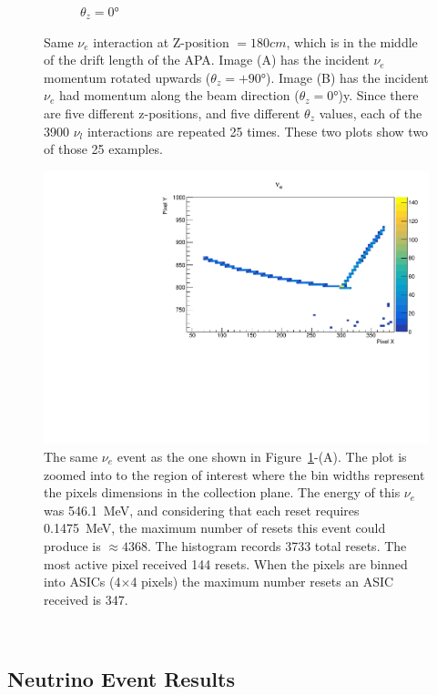 \begin{figure}
\begin{subfigure}{.5\textwidth}
  \caption{$\theta_{z} = 0$\unit{\degree}}
\end{subfigure}
\caption{Same $\nu_{e}$ interaction at Z-position $= 180 cm$, which is in the middle of the drift length of the APA.
Image (A) has the incident $\nu_{e}$ momentum rotated upwards ($\theta_{z} = +90$\unit{\degree}).
Image (B) has the incident $\nu_{e}$ had momentum along the beam direction ($\theta_{z} = 0$\unit{\degree})y.
Since there are five different z-positions, and five different $\theta_{z}$ values, each of the 3900 $\nu_{l}$ interactions are repeated 25 times.
These two plots show two of those 25 examples.
}
\label{fig:compare_integral}
\end{figure}

\begin{figure}[]
\centering
\includegraphics[width=\textwidth]{images/electron_fhc_23708_event.pdf}
\caption{The same $\nu_{e}$ event as the one shown in Figure~\ref{fig:compare_integral}-(A).
The plot is zoomed into to the region of interest where the bin widths represent the pixels dimensions in the collection plane.
The energy of this $\nu_{e}$ was 546.1~\unit{MeV}, and considering that each reset requires 0.1475~\unit{MeV}, the maximum number of resets this event could produce is $\approx 4368$.
The histogram records 3733 total resets.
The most active pixel received 144 resets.
When the pixels are binned into ASICs (4$\times$4 pixels) the maximum number resets an ASIC received is 347.
}
\end{figure}~\label{fig:asic_th2i_electron_fhc_event}

\subsection{Neutrino Event Results}

